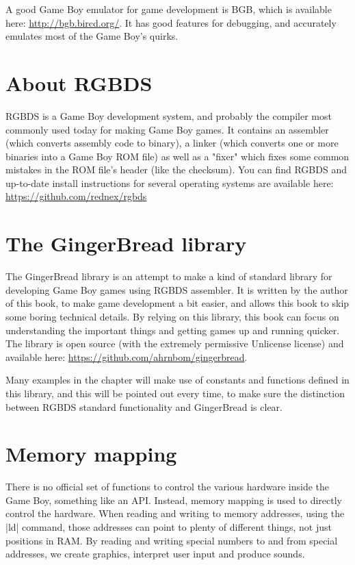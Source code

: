 \documentclass[11pt]{book}
\begin{document}
A good Game Boy emulator for game development is BGB, which is available here: \url{http://bgb.bircd.org/}. It has good features for debugging, and accurately emulates most of the Game Boy's quirks. 

\section{About RGBDS}
\label{rgbds}
RGBDS is a Game Boy development system, and probably the compiler most commonly used today for making Game Boy games. It contains an assembler (which converts assembly code to binary), a linker (which converts one or more binaries into a Game Boy ROM file) as well as a "fixer" which fixes some common mistakes in the ROM file's header (like the checksum). You can find RGBDS and up-to-date install instructions for several operating systems are available here: \url{https://github.com/rednex/rgbds}

\section{The GingerBread library}
\label{gingerbread}
The GingerBread library is an attempt to make a kind of standard library for developing Game Boy games using RGBDS assembler. It is written by the author of this book, to make game development a bit easier, and allows this book to skip some boring technical details. By relying on this library, this book can focus on understanding the important things and getting games up and running quicker. The library is open source (with the extremely permissive Unlicense license) and available here: \url{https://github.com/ahrnbom/gingerbread}. 

Many examples in the chapter will make use of constants and functions defined in this library, and this will be pointed out every time, to make sure the distinction between RGBDS standard functionality and GingerBread is clear.

\section{Memory mapping} 
\label{memmapping}
There is no official set of functions to control the various hardware inside the Game Boy, something like an API. Instead, memory mapping is used to directly control the hardware. When reading and writing to memory addresses, using the |ld| command, those addresses can point to plenty of different things, not just positions in RAM. By reading and writing special numbers to and from special addresses, we create graphics, interpret user input and produce sounds.
\end{document}
